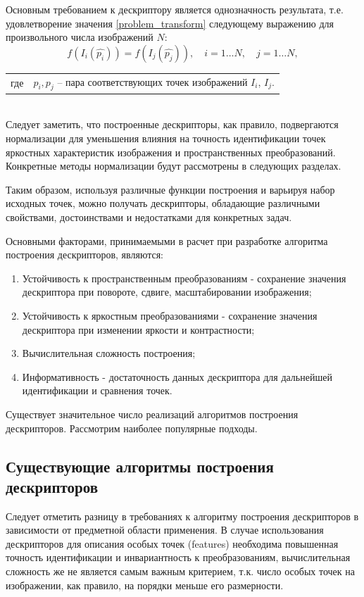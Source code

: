 {{	Основным требованием к дескриптору является однозначность результата, т.е. удовлетворение значения \eqref{problem_transform}  следующему выражению для произвольного числа изображений $N$:
	\begin{equation}\label{problem_constraints}
	f(I_i(\hat{p_i})) = f(I_j(\hat{p_j})), \quad i=1 \hdots N, \quad j=1 \hdots N,
	\end{equation} 
	\begin{tabular}{ rl }
	\quad \quad где 
	& $p_i, p_j$ -- пара соответствующих точек изображений $I_i$, $I_j$.
	\end{tabular}\\

	Следует заметить, что построенные дескрипторы, как правило, подвергаются нормализации для уменьшения влияния на точность идентификации точек яркостных характеристик изображения и пространственных преобразований. Конкретные методы нормализации будут рассмотрены в следующих разделах. 
	
	Таким образом, используя различные функции построения и варьируя набор исходных точек, можно получать дескрипторы, обладающие различными свойствами, достоинствами и недостатками для конкретных задач. 
	
	Основными факторами, принимаемыми в расчет при разработке алгоритма построения дескрипторов, являются:
	\begin{enumerate}
	   	\item Устойчивость к пространственным преобразованиям - сохранение значения дескриптора при повороте, сдвиге, масштабировании изображения;
	   	\item Устойчивость к яркостным преобразованиями - сохранение значения дескриптора при изменении яркости и контрастности;
	   	\item Вычислительная сложность построения;
	   	\item Информативность - достаточность данных дескриптора для дальнейшей идентификации и сравнения точек.
	\end{enumerate} 

	Существует значительное число реализаций алгоритмов построения дескрипторов. Рассмотрим наиболее популярные подходы.

\subsection{Существующие алгоритмы построения дескрипторов}{
	
	Следует отметить разницу в требованиях к алгоритму построения дескрипторов в зависимости от предметной области применения. В случае использования дескрипторов для описания особых точек (features) необходима повышенная точность идентификации и инвариантность к преобразованиям, вычислительная сложность же не является самым важным критерием, т.к. число особых точек на изображении, как правило, на порядки меньше его размерности. 
	
}}}
